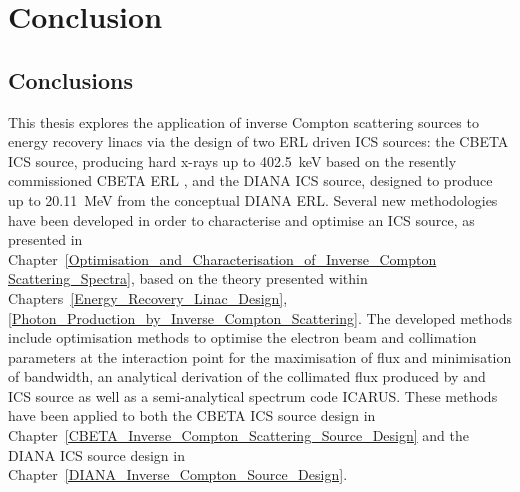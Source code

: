\documentclass[../main.tex]{subfiles}
\begin{document}
\chapter{Conclusion}
\label{Conclusion} %

\section{Conclusions}

This thesis explores the application of inverse Compton scattering sources to energy recovery linacs via the design of two ERL driven ICS sources: the CBETA ICS source, producing hard x-rays up to 402.5~\si{\kilo\electronvolt} based on the resently commissioned CBETA ERL \cite{bartnik2020cbeta}, and the DIANA ICS source, designed to produce up to 20.11~\si{\mega\electronvolt} from the conceptual DIANA ERL. Several new methodologies have been developed in order to characterise and optimise an ICS source, as presented in Chapter~\ref{Optimisation_and_Characterisation_of_Inverse_Compton Scattering_Spectra}, based on the theory presented within Chapters~\ref{Energy_Recovery_Linac_Design}, \ref{Photon_Production_by_Inverse_Compton_Scattering}. The developed methods include optimisation methods to optimise the electron beam and collimation parameters at the interaction point for the maximisation of flux and minimisation of bandwidth, an analytical derivation of the collimated flux produced by and ICS source as well as a semi-analytical spectrum code \textsc{ICARUS}. These methods have been applied to both the CBETA ICS source design in Chapter~\ref{CBETA_Inverse_Compton_Scattering_Source_Design} and the DIANA ICS source design in Chapter~\ref{DIANA_Inverse_Compton_Source_Design}.
\end{document}
